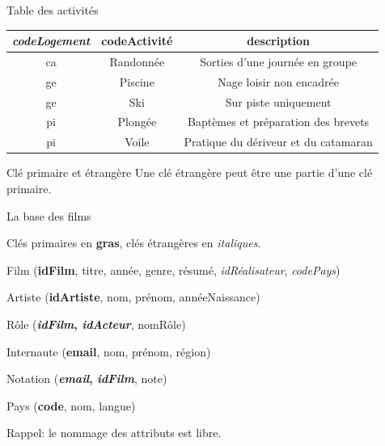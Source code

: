 \begin{frame}[fragile]{Table des activités}
\begin{center}
\begin{tabular}{c|c|c}
\textbf{\textit{codeLogement}} & \textbf{codeActivité} & \textbf{description}\\ \hline 
ca & Randonnée & Sorties d’une journée en groupe\\ \hline 
ge & Piscine & Nage loisir non encadrée\\ \hline 
ge & Ski & Sur piste uniquement\\ \hline 
pi & Plongée & Baptèmes et préparation des brevets\\ \hline 
pi & Voile & Pratique du dériveur et du catamaran\\ \hline 
\end{tabular}
\end{center}


\vfill

\begin{blocgauche}
\begin{remblock}{Clé primaire et étrangère }
Une clé étrangère peut être une partie d'une clé primaire.
\end{remblock}
\end{blocgauche}
\end{frame}


\begin{frame}{La base des films}

Clés primaires en \textbf{gras}, clés étrangères en \textit{italiques}.

\vfill
\begin{redbullet}
  \item Film (\textbf{idFilm}, titre, année, genre, résumé, \textit{idRéalisateur}, \textit{codePays})
  \item Artiste (\textbf{idArtiste}, nom, prénom, annéeNaissance)
    \item Rôle (\textbf{\textit{idFilm}, \textit{idActeur}}, nomRôle)
   \item Internaute (\textbf{email}, nom, prénom, région)
     \item Notation (\textbf{\textit{email}, \textit{idFilm}}, note)
   \item Pays (\textbf{code}, nom, langue)
\end{redbullet}


\vfill
\begin{blocgauche}
Rappel: le nommage des attributs est libre.
\end{blocgauche}
\end{frame}

